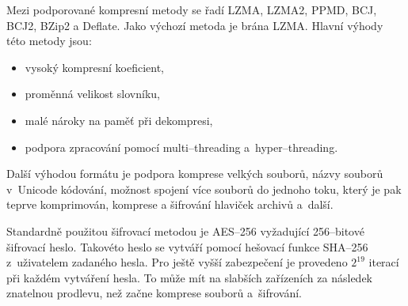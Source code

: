  Mezi podporované kompresní metody se řadí LZMA, LZMA2, PPMD, BCJ, BCJ2, BZip2 a
Deflate. Jako výchozí metoda je brána LZMA. Hlavní výhody této metody jsou:
\begin{itemize}
    \item vysoký kompresní koeficient,
    \item proměnná velikost slovníku,
    \item malé nároky na paměť při dekompresi,
    \item podpora zpracování pomocí multi--threading a~hyper--threading.
\end{itemize}
Další výhodou formátu je podpora komprese velkých souborů, názvy souborů v~Unicode
kódování, možnost spojení více souborů do jednoho toku, který je pak teprve komprimován, komprese
a šifrování hlaviček archivů a~další.

 Standardně použitou šifrovací metodou je AES--256 vyžadující 256--bitové šifrovací heslo.
Takovéto heslo se vytváří pomocí hešovací funkce SHA--256 z~uživatelem zadaného hesla. Pro ještě
vyšší zabezpečení je provedeno \(2^{19}\) iterací při každém vytváření hesla. To může mít na
slabších zařízeních za následek znatelnou prodlevu, než začne komprese souborů a~šifrování.

